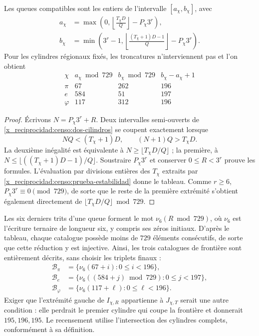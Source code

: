 \begin{proposition}
\label{x_reciprocidad:censo:catalogos}
Les queues compatibles sont les entiers de l'intervalle \([a_\chi,b_\chi]\),
avec
\begin{align}
 a_\chi&=\max\left(0,
       \left\lfloor\frac{T_\chi D}{Q}\right\rfloor-P_\chi3^r\right),
       \label{x_reciprocidad:censo:extremo-a}\\
 b_\chi&=\min\left(3^r-1,
       \left\lfloor\frac{(T_\chi+1)D-1}{Q}\right\rfloor-P_\chi3^r\right).
       \label{x_reciprocidad:censo:extremo-b}
\end{align}
Pour les cylindres régionaux fixés, les troncatures n'interviennent pas et l'on obtient
\begin{equation}
\begin{array}{c|r|r|r}
 \chi&a_\chi\bmod729&b_\chi\bmod729&b_\chi-a_\chi+1\\\hline
 \pi&67&262&196\\
 e&584&51&197\\
 \varphi&117&312&196
\end{array}
\label{x_reciprocidad:censo:tabla-catalogos}
\end{equation}
\end{proposition}
\begin{proof}
Écrivons \(N=P_\chi3^r+R\). Deux intervalles semi-ouverts de
\eqref{x_reciprocidad:censo:dos-cilindros} se coupent exactement lorsque
\[
 NQ<(T_\chi+1)D,\qquad (N+1)Q>T_\chi D.
\]
La deuxième inégalité est équivalente à  
\(N\geq\lfloor T_\chi D/Q\rfloor\) ; la première, à  
\(N\leq\lfloor((T_\chi+1)D-1)/Q\rfloor\). Soustraire  
\(P_\chi3^r\) et conserver \(0\leq R<3^r\) prouve les formules.  
L'évaluation par divisions entières des \(T_\chi\) extraits par  
\eqref{x_reciprocidad:censo:prueba-estabilidad} donne le tableau. Comme \(r\geq6\),  
\(P_\chi3^r\equiv0\pmod{729}\), de sorte que le reste de la première  
extrémité s'obtient également directement de  
\(\lfloor T_\chi D/Q\rfloor\bmod729\).
\end{proof}

Les six derniers trits d'une queue forment le mot
\(\nu_6(R\bmod729)\), où \(\nu_6\) est l'écriture ternaire
de longueur six, y compris ses zéros initiaux. D'après le tableau, chaque
catalogue possède moins de \(729\) éléments consécutifs, de sorte que
cette réduction y est injective. Ainsi, les trois catalogues de frontière
sont entièrement décrits, sans choisir les triplets finaux :
\begin{equation}
 \begin{split}
 \mathcal B_\pi&=\{\nu_6(67+i):0\leq i<196\},\\
 \mathcal B_e&=\{\nu_6((584+j)\bmod729):0\leq j<197\},\\
 \mathcal B_\varphi&=\{\nu_6(117+\ell):0\leq\ell<196\}.
 \end{split}
 \label{x_reciprocidad:censo:fronteras-explicitas}
\end{equation}
Exiger que l'extrémité gauche de \(I_{\chi,R}\) appartienne à
\(J_{\chi,T}\) serait une autre condition : elle perdrait le premier cylindre
qui coupe la frontière et donnerait \(195,196,195\). Le recensement utilise l'intersection des cylindres complets, conformément à sa définition.

